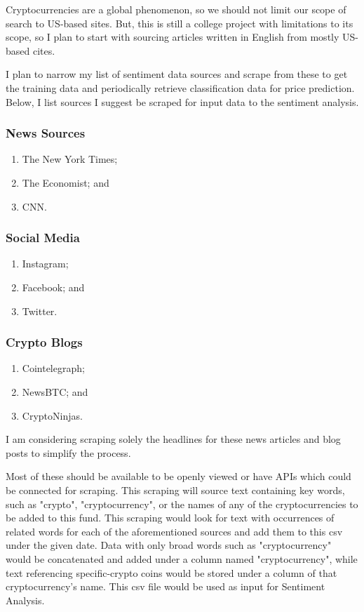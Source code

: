 \documentclass[10pt,twocolumn]{article}
\begin{document}
Cryptocurrencies are a global phenomenon, so we should not limit our scope of search to US-based sites. But, this is still a college project with limitations to its scope, so I plan to start with sourcing articles written in English from mostly US-based cites.

I plan to narrow my list of sentiment data sources and scrape from these to get the training data and periodically retrieve classification data for price prediction. Below, I list sources I suggest be scraped for input data to the sentiment analysis.

\subsubsection{News Sources}
\label{sec:newssources}

\begin{enumerate}
    \item The New York Times;
    \item The Economist; and
    \item CNN.
\end{enumerate}

\subsubsection{Social Media}

\begin{enumerate}
    \item Instagram;
    \item Facebook; and
    \item Twitter.
\end{enumerate}

\subsubsection{Crypto Blogs}

\begin{enumerate}
    \item Cointelegraph;
    \item NewsBTC; and
    \item CryptoNinjas.
\end{enumerate}

I am considering scraping solely the headlines for these news articles and blog posts to simplify the process.

Most of these should be available to be openly viewed or have APIs which could be connected for scraping. This scraping will source text containing key words, such as "crypto", "cryptocurrency", or the names of any of the cryptocurrencies to be added to this fund. This scraping would look for text with occurrences of related words for each of the aforementioned sources and add them to this csv under the given date. Data with only broad words such as "cryptocurrency" would be concatenated and added under a column named "cryptocurrency", while text referencing specific-crypto coins would be stored under a column of that cryptocurrency's name. This csv file would be used as input for Sentiment Analysis.
\end{document}
